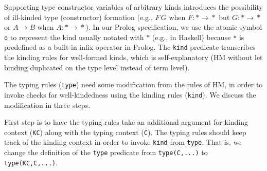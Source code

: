 \documentclass[runningheads,a4paper]{llncs}
\begin{document}
Supporting type constructor variables of
arbitrary kinds introduces the possibility of ill-kinded type (constructor)
formation (e.g., $F\,G$ when $F:*\!\to\!*$ but $G:*\!\to\!*$ \;or\; 
$A\!\to\!B$ when $A:*\!\to\!*$). In our Prolog specification, we use
the atomic symbol \verb|o| to represent the kind usually notated with $*$
(e.g., in Haskell) because \verb|*| is predefined as a built-in infix
operator in Prolog. The \verb|kind| predicate transcribes the kinding rules
for well-formed kinds, which is self-explanatory (HM without let binding
duplicated on the type level instead of term level).

The typing rules (\verb|type|) need some modification from the rules of HM,
in order to invoke checks for well-kindedness using the kinding rules
(\verb|kind|). We discuss the modification in three steps.

First step is to have the typing rules take an additional argument for
kinding context (\verb|KC|) along with the typing context (\verb|C|).
The typing rules
should keep track of the kinding context in order to invoke \verb|kind|
from \verb|type|.  That is, we change the definition of the \verb|type|
predicate from \verb|type(C,...)| to \verb|type(KC,C,...)|.
\end{document}
